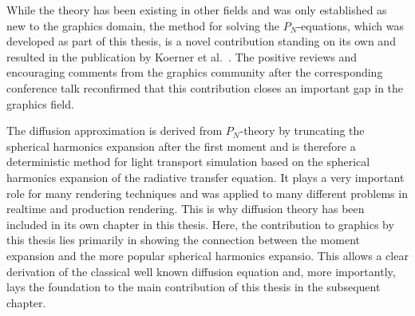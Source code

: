 While the theory has been existing in other fields and was only established as new to the graphics domain, the method for solving the $P_N$-equations, which was developed as part of this thesis, is a novel contribution standing on its own and resulted in the publication by Koerner et al.~\cite{Koerner18}. The positive reviews and encouraging comments from the graphics community after the corresponding conference talk reconfirmed that this contribution closes an important gap in the graphics field.

The diffusion approximation is derived from $P_N$-theory by truncating the spherical harmonics expansion after the first moment and is therefore a deterministic method for light transport simulation based on the spherical harmonics expansion of the radiative transfer equation. It plays a very important role for many rendering techniques and was applied to many different problems in realtime and production rendering. This is why diffusion theory has been included in its own chapter in this thesis. Here, the contribution to graphics by this thesis lies primarily in showing the connection between the moment expansion and the more popular spherical harmonics expansio. This allows a clear derivation of the classical well known diffusion equation and, more importantly, lays the foundation to the main contribution of this thesis in the subsequent chapter.


